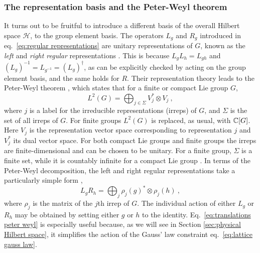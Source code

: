 \subsubsection{The representation basis and the Peter-Weyl theorem}\label{sec:representation basis}

It turns out to be fruitful to introduce a different basis of the overall Hilbert space $\mathcal{H}$,  to the group element basis.
The operators $L_g$ and $R_g$ introduced in eq.~\eqref{eq:regular representations} are unitary representations of $G$, known as the \textit{left} and \textit{right regular} representations \cite{Serre, KnappLieGroups}.
This is because $L_g L_h = L_{gh}$ and $(L_g)^{-1}=L_{g^{-1}}=(L_g)^\dagger$, as can be explicitly checked by acting on the group element basis, and the same holds for $R$.
Their representation theory leads to the Peter-Weyl theorem \cite{KnappLieGroups, milstead2018qyangmills, marianithesis}, which states that for a finite or compact Lie group $G$,
\begin{equation}
    \label{eq:peterweyl}
    L^2(G) = \bigoplus_{j \in \Sigma} V_j^* \otimes V_j \ ,
\end{equation}
where $j$ is a label for the irreducible representations (irreps) of $G$, and $\Sigma$ is the set of all irreps of $G$.
For finite groups $L^2(G)$ is replaced, as usual, with $\mathbb{C}[G]$.
Here $V_j$ is the representation vector space corresponding to representation $j$ and $V_j^*$ its dual vector space.
For both compact Lie groups and finite groups the irreps are finite-dimensional and can be chosen to be unitary.
For a finite group, $\Sigma$ is a finite set, while it is countably infinite for a compact Lie group \cite{KnappLieGroups, Serre}.
In terms of the Peter-Weyl decomposition, the left and right regular representations take a particularly simple form \cite{marianithesis},
\begin{equation}
    \label{eq:translations peter weyl}
    L_g R_h = \bigoplus_j \rho_j(g)^* \otimes \rho_j(h) \ ,
\end{equation}
where $\rho_j$ is the matrix of the $j$th irrep of $G$.
The individual action of either $L_g$ or $R_h$ may be obtained by setting either $g$ or $h$ to the identity.
Eq.~\eqref{eq:translations peter weyl} is especially useful because, as we will see in Section \ref{sec:physical Hilbert space}, it simplifies the action of the Gauss' law constraint eq.~\eqref{eq:lattice gauss law}.

